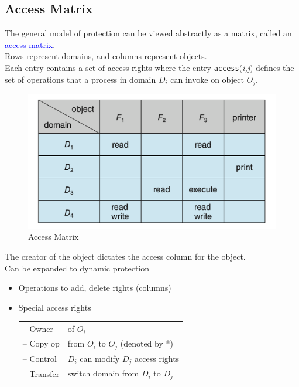\documentclass[oneside]{book}
\begin{document}
            \subsection{Access Matrix}
                The general model of protection can be viewed abstractly as a matrix, called an \textcolor{blue}{access matrix}. \\
                Rows represent domains, and columns represent objects.\\
                Each entry contains a set of access rights where the entry \texttt{access}(\textit{i,j}) defines the set of operations 
                that a process in domain $D_i$ can invoke on object $O_j$.\\
                \begin{figure}[H]
                    \centering
                    \includegraphics[width=0.6\linewidth]{figures/access_matrix.png}
                    \caption{Access Matrix}
                \end{figure}
                The creator of the object dictates the access column for the object.\\
                Can be expanded to dynamic protection
                \begin{itemize}
                    \item Operations to add, delete rights (columns)
                    \item Special access rights\\
                    \begin{tabular}{ll}
                        -- Owner & of $O_i$ \\
                        -- Copy op & from $O_i$ to $O_j$ (denoted by *) \\
                        -- Control & $D_i$ can modify $D_j$ access rights \\
                        -- Transfer & switch domain from $D_i$ to $D_j$ \\
                    \end{tabular}
                \end{itemize}
\end{document}
